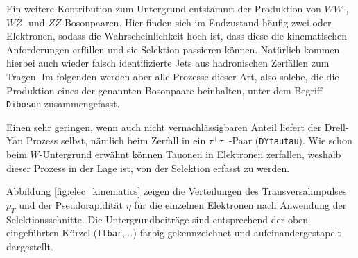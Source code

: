 Ein weitere Kontribution zum Untergrund entstammt der Produktion von $WW$-,
$WZ$- und $ZZ$-Bosonpaaren. Hier finden sich im Endzustand häufig zwei oder
Elektronen, sodass die Wahrscheinlichkeit hoch ist, dass diese die
kinematischen Anforderungen erfüllen und sie Selektion passieren können.
Natürlich kommen hierbei auch wieder falsch identifizierte Jets aus
hadronischen Zerfällen zum Tragen. Im folgenden werden aber alle Prozesse
dieser Art, also solche, die die Produktion eines der genannten Bosonpaare
beinhalten, unter dem Begriff \texttt{Diboson} zusammengefasst.

Einen sehr geringen, wenn auch nicht vernachlässigbaren Anteil liefert der
Drell-Yan Prozess selbst, nämlich beim Zerfall in ein $\tau^+\tau^-$-Paar
(\texttt{DYtautau}). Wie schon beim $W$-Untergrund erwähnt können Tauonen in
Elektronen zerfallen, weshalb dieser Prozess in der Lage ist, von der Selektion
erfasst zu werden.

Abbildung \ref{fig:elec_kinematics} zeigen die
Verteilungen des Transversalimpulses $p_T$ und der Pseudorapidität $\eta$ für
die einzelnen Elektronen nach Anwendung der Selektionsschnitte. Die
Untergrundbeiträge sind entsprechend der oben eingeführten Kürzel
(\texttt{ttbar},...) farbig gekennzeichnet und aufeinandergestapelt
dargestellt.

